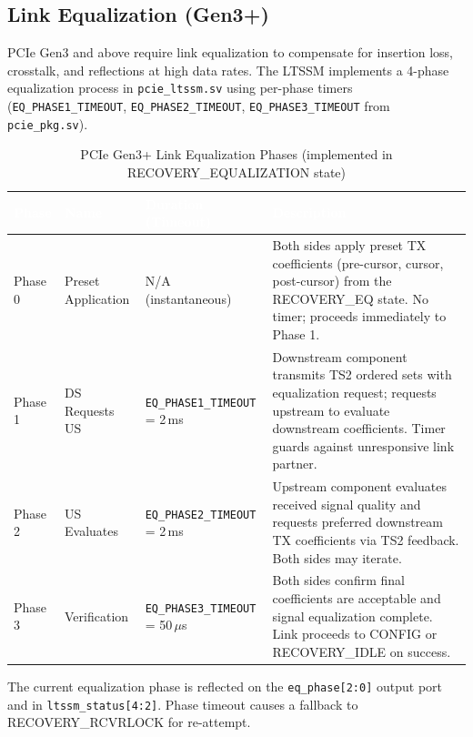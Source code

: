 \documentclass[11pt,a4paper]{article}
\newcommand{\theadcell}[1]{%
  \cellcolor{tablehead}\textcolor{white}{\textbf{#1}}}
\begin{document}
\subsection{Link Equalization (Gen3+)}
\label{subsec:equalization}

PCIe Gen3 and above require link equalization to compensate for insertion loss,
crosstalk, and reflections at high data rates. The LTSSM implements a 4-phase
equalization process in \texttt{pcie\_ltssm.sv} using per-phase timers
(\texttt{EQ\_PHASE1\_TIMEOUT}, \texttt{EQ\_PHASE2\_TIMEOUT},
\texttt{EQ\_PHASE3\_TIMEOUT} from \texttt{pcie\_pkg.sv}).

\begin{table}[h!]
\centering
\begin{tabular}{p{1.2cm}p{3cm}p{3.5cm}p{7cm}}
  \toprule
  \theadcell{Phase} & \theadcell{Name} & \theadcell{Duration (Timeout)} & \theadcell{Description} \\
  \midrule
  Phase 0 & Preset Application & N/A (instantaneous) & Both sides apply preset TX coefficients (pre-cursor, cursor, post-cursor) from the RECOVERY\_EQ state. No timer; proceeds immediately to Phase 1. \\
  Phase 1 & DS Requests US     & \texttt{EQ\_PHASE1\_TIMEOUT} = 2\,ms & Downstream component transmits TS2 ordered sets with equalization request; requests upstream to evaluate downstream coefficients. Timer guards against unresponsive link partner. \\
  Phase 2 & US Evaluates       & \texttt{EQ\_PHASE2\_TIMEOUT} = 2\,ms & Upstream component evaluates received signal quality and requests preferred downstream TX coefficients via TS2 feedback. Both sides may iterate. \\
  Phase 3 & Verification       & \texttt{EQ\_PHASE3\_TIMEOUT} = 50\,$\mu$s & Both sides confirm final coefficients are acceptable and signal equalization complete. Link proceeds to CONFIG or RECOVERY\_IDLE on success. \\
  \bottomrule
\end{tabular}
\caption{PCIe Gen3+ Link Equalization Phases (implemented in RECOVERY\_EQUALIZATION state)}
\end{table}

The current equalization phase is reflected on the \texttt{eq\_phase[2:0]} output
port and in \texttt{ltssm\_status[4:2]}. Phase timeout causes a fallback to
RECOVERY\_RCVRLOCK for re-attempt.

\end{document}
